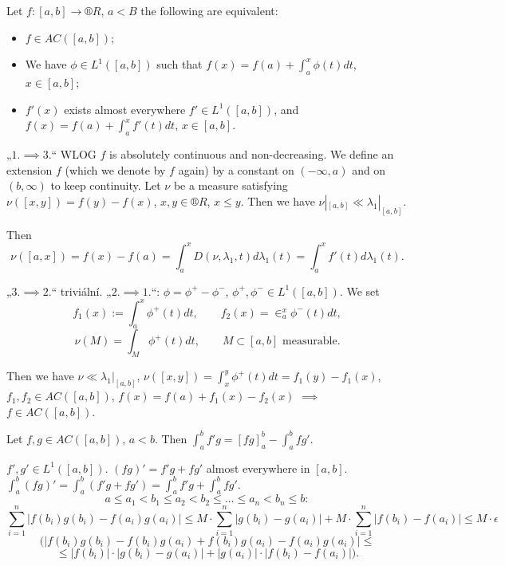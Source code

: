 \documentclass[12pt]{article}					%
\begin{document}

\begin{veta}
	Let $f: [a, b] \rightarrow ®R$, $a < B$ the following are equivalent:

	\begin{itemize}
		\item $f \in AC([a, b])$;
		\item We have $\phi \in L^1([a, b])$ such that $f(x) = f(a) + \int_a^x \phi(t) dt$, $x \in [a, b]$;
		\item $f'(x)$ exists almost everywhere $f' \in L^1([a, b])$, and $f(x) = f(a) + \int_a^x f'(t) dt$, $x \in [a, b]$.
	\end{itemize}

	\begin{dukazin}
		„$1. \implies 3.$“ WLOG $f$ is absolutely continuous and non-decreasing. We define an extension $f$ (which we denote by $f$ again) by a constant on $(-∞, a)$ and on $(b, ∞)$ to keep continuity. Let $\nu$ be a measure satisfying $\nu([x, y]) = f(y) - f(x)$, $x, y \in ®R$, $x ≤ y$. Then we have $\nu|_{[a, b]} \ll \lambda_1|_{[a, b]}$.

		Then
		$$ \nu([a, x]) = f(x) - f(a) = \int_a^x D(\nu, \lambda_1, t) d\lambda_1(t) = \int_a^x f'(t) d\lambda_1(t). $$

		„$3. \implies 2.$“ triviální. „$2. \implies 1.$“: $\phi = \phi^+ - \phi^-$, $\phi^+, \phi^- \in L^1([a, b])$. We set
		$$ f_1(x) := \int_a^x \phi^+(t) dt, \qquad f_2(x) = \in_a^x \phi^-(t) dt, $$
		$$ \nu(M) = \int_M \phi^+(t) dt, \qquad M \subset [a, b] \text{ measurable}. $$
		
		Then we have $\nu \ll \lambda_1|_{[a, b]}$, $\nu([x, y]) = \int_x^y \phi^+(t) dt = f_1(y) - f_1(x)$, $f_1, f_2 \in AC([a, b])$, $f(x) = f(a) + f_1(x) - f_2(x)$ $\implies$ $f \in AC([a, b])$.
	\end{dukazin}
\end{veta}

\begin{veta}
	Let $f, g \in AC([a, b])$, $a < b$. Then $\int_a^b f' g = [f g]_a^b - \int_a^b f g'$.

	\begin{dukazin}
		$f', g' \in L^1([a, b])$. $(fg)' = f'g + fg'$ almost everywhere in $[a, b]$. $\int_a^b (fg)' = \int_a^b (f'g + fg') = \int_a^b f'g + \int_a^b f g'$.
		$$ a ≤ a_1 < b_1 ≤ a_2 < b_2 ≤ … ≤ a_n < b_n ≤ b: $$
		$$ \sum_{i=1}^n |f(b_i)g(b_i) - f(a_i)g(a_i)| ≤ M·\sum_{i=1}^n |g(b_i) - g(a_i)| + M·\sum_{i=1}^n |f(b_i) - f(a_i)| ≤ M·\epsilon $$
		$$ (|f(b_i)g(b_i) - f(b_i)g(a_i) + f(b_i)g(a_i) - f(a_i)g(a_i)| ≤ $$
		$$ ≤ |f(b_i)|·|g(b_i) - g(a_i)| + |g(a_i)|·|f(b_i) - f(a_i)|). $$
	\end{dukazin}
\end{veta}
\end{document}
